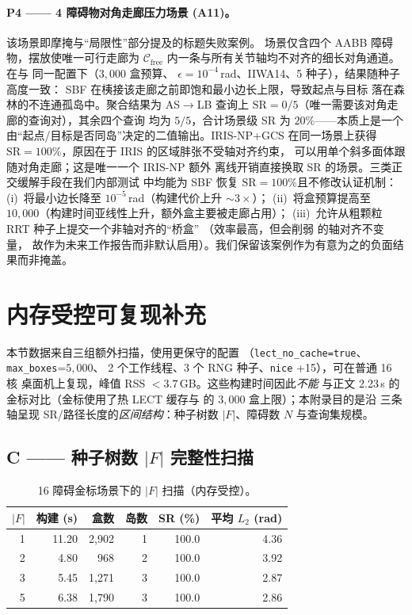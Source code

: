 \documentclass[journal]{IEEEtran}
\newcommand{\Cfree}{\mathcal{C}_{\mathrm{free}}}
\begin{document}
\paragraph{P4 —— 4 障碍物对角走廊压力场景 (A11)。}
该场景即摩掩与“局限性”部分提及的标题失败案例。
场景仅含四个 AABB 障碍物，摆放使唯一可行走廊为 $\Cfree$
内一条与所有关节轴均不对齐的细长对角通道。在与
 同一配置下（$3{,}000$ 盒预算、
$\epsilon=10^{-4}$\,rad、IIWA14、5 种子），结果随种子高度一致：
SBF 在桋接该走廊之前即饱和最小边长上限，导致起点与目标
落在森林的不连通孤岛中。聚合结果为 AS$\to$LB 查询上
$\text{SR}=0/5$（唯一需要该对角走廊的查询对），其余四个查询
均为 $5/5$，合计场景级 SR 为 $20\%$——本质上是一个由“起点/目标是否同岛”决定的二值输出。IRIS-NP+GCS 在同一场景上获得
$\text{SR}=100\%$，原因在于 IRIS 的区域肨张不受轴对齐约束，
可以用单个斜多面体跟随对角走廊；这是唯一一个 IRIS-NP 额外
离线开销直接换取 SR 的场景。三类正交缓解手段在我们内部测试
中均能为 SBF 恢复 $\text{SR}=100\%$且不修改认证机制：
(i)~将最小边长降至 $10^{-5}$\,rad（构建代价上升 $\sim 3\times$）；
(ii)~将盒预算提高至 $10{,}000$（构建时间亚线性上升，额外盒主要被走廊占用）；
(iii)~允许从粗颗粒 RRT 种子上提交一个非轴对齐的“桥盒”
（效率最高，但会削弱  的轴对齐不变量，
故作为未来工作报告而非默认启用）。我们保留该案例作为有意为之的负面结果而非掩盖。

\section{内存受控可复现补充}\label{app:repro_supp}

本节数据来自三组额外扫描，使用更保守的配置
（\texttt{lect\_no\_cache=true}、\texttt{max\_boxes}=$5{,}000$、
2 个工作线程、3 个 RNG 种子、\texttt{nice} +15），可在普通 16 核
桌面机上复现，峰值 RSS ${<}3.7$\,GB。这些构建时间因此\emph{不能}
与正文 2.23\,s 的金标对比（金标使用了热 LECT 缓存与
 的 $3{,}000$ 盒上限）；本附录目的是沿
三条轴呈现 SR/路径长度的\emph{区间结构}：种子树数 $|F|$、障碍数
$N$ 与查询集规模。

\subsection{C —— 种子树数 $|F|$ 完整性扫描}\label{app:c_forest}

\begin{table}[ht]
\centering
\small
\caption{16 障碍金标场景下的 $|F|$ 扫描（内存受控）。}
\label{tab:forest_size_supp_zh}
\begin{tabular}{@{}rrrrrr@{}}
\toprule
$|F|$ & 构建 (s) & 盒数 & 岛数 & SR (\%) & 平均 $L_2$ (rad) \\
\midrule
1 & 11.20 & 2{,}902 & 1 & 100.0 & 4.36 \\
2 & 4.80  & 968    & 2 & 100.0 & 3.92 \\
3 & 5.45  & 1{,}271 & 3 & 100.0 & 2.87 \\
5 & 6.38  & 1{,}790 & 3 & 100.0 & 2.86 \\
\bottomrule
\end{tabular}
\end{table}
\end{document}
